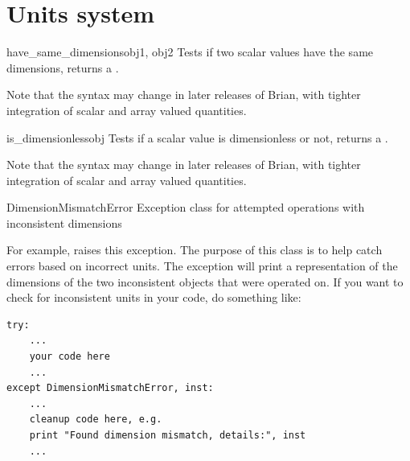 \documentclass[letterpaper,10pt,english]{manual}
\begin{document}
\resetcurrentobjects
\hypertarget{--doc-reference-units}{}

\hypertarget{index-114}{}\section{Units system}

\hypertarget{brian.have_same_dimensions}{}\begin{funcdesc}{have\_same\_dimensions}{obj1, obj2}
Tests if two scalar values have the same dimensions, returns a .

Note that the syntax may change in later releases of Brian, with tighter
integration of scalar and array valued quantities.
\end{funcdesc}

\hypertarget{brian.is_dimensionless}{}\begin{funcdesc}{is\_dimensionless}{obj}
Tests if a scalar value is dimensionless or not, returns a .

Note that the syntax may change in later releases of Brian, with tighter
integration of scalar and array valued quantities.
\end{funcdesc}

\hypertarget{brian.DimensionMismatchError}{}\begin{excdesc}{DimensionMismatchError}
Exception class for attempted operations with inconsistent dimensions

For example,  raises this exception. The purpose of this
class is to help catch errors based on incorrect units. The exception will
print a representation of the dimensions of the two inconsistent objects
that were operated on. If you want to check for inconsistent units in your
code, do something like:

\begin{Verbatim}[commandchars=@\[\]]
try:
    ...
    your code here
    ...
except DimensionMismatchError, inst:
    ...
    cleanup code here, e.g.
    print "Found dimension mismatch, details:", inst
    ...
\end{Verbatim}
\end{excdesc}
\end{document}
